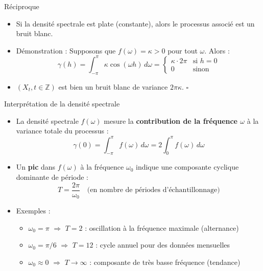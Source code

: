 \documentclass[11pt,aspectratio=169]{beamer}
\newcommand{\Z}{\mathbb{Z}}
\begin{document}
\begin{frame}{Réciproque}

\begin{itemize}

\item Si la densité spectrale est plate (constante), alors le processus associé est un bruit blanc.\newline

\item Démonstration : Supposons que $f(\omega) = \kappa > 0$ pour tout $\omega$. Alors :
  \[
  \gamma(h) = \int_{-\pi}^{\pi} \kappa \cos(\omega h) \, d\omega = \begin{cases}
  \kappa \cdot 2\pi & \text{si } h = 0 \\
  0 & \text{sinon}
  \end{cases}
  \]\newline

\item $(X_t, t \in \Z)$ est bien un bruit blanc de variance $2\pi\kappa$. \hfill $\square$

\end{itemize}

\end{frame}

\begin{frame}{Interprétation de la densité spectrale}

\begin{itemize}

\item La densité spectrale $f(\omega)$ mesure la \textbf{contribution de la fréquence $\omega$} à la variance totale du processus :
  \[
  \gamma(0) = \int_{-\pi}^{\pi} f(\omega) \, d\omega = 2 \int_{0}^{\pi} f(\omega) \, d\omega
  \]\newline

\item Un \textbf{pic} dans $f(\omega)$ à la fréquence $\omega_0$ indique une composante cyclique dominante de période :
  \[
  T = \frac{2\pi}{\omega_0}\quad\text{(en nombre de périodes d'échantillonnage)}
  \]

\item Exemples :
  \begin{itemize}
    \item $\omega_0 = \pi$ $\Rightarrow$ $T = 2$ : oscillation à la fréquence maximale (alternance)\newline
    \item $\omega_0 = \pi/6$ $\Rightarrow$ $T = 12$ : cycle annuel pour des données mensuelles\newline
    \item $\omega_0 \approx 0$ $\Rightarrow$ $T \to \infty$ : composante de très basse fréquence (tendance)
  \end{itemize}

\end{itemize}

\end{frame}
\end{document}
